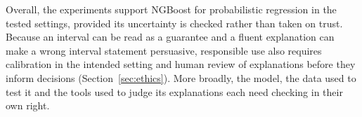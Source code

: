 Overall, the experiments support NGBoost for probabilistic regression in the tested settings, provided its uncertainty is checked rather than taken on trust.
Because an interval can be read as a guarantee and a fluent explanation can make a wrong interval statement persuasive, responsible use also requires calibration in the intended setting and human review of explanations before they inform decisions (Section~\ref{sec:ethics}).
More broadly, the model, the data used to test it and the tools used to judge its explanations each need checking in their own right.
